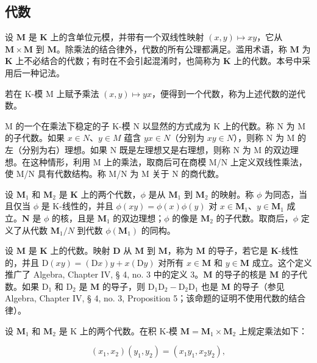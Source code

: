 \subsection{代数}

设 \(\mathbf{M}\) 是 \(\mathbf{K}\) 上的含单位元模，并带有一个双线性映射 \((x,y)\mapsto xy\)，它从 \(\mathbf{M}\times \mathbf{M}\) 到 \(\mathbf{M}\)。除乘法的结合律外，代数的所有公理都满足。滥用术语，称 \(\mathbf{M}\) 为 \(\mathbf{K}\) 上不必结合的代数；有时在不会引起混淆时，也简称为 \(\mathbf{K}\) 上的代数。本号中采用后一种记法。

若在 K-模 M 上赋予乘法 \((x,y)\mapsto yx\)，便得到一个代数，称为上述代数的逆代数。

M 的一个在乘法下稳定的子 K-模 N 以显然的方式成为 K 上的代数。称 N 为 M 的子代数。如果 \(x \in N\)、\(y \in M\) 蕴含 \(yx \in N\)（分别为 \(xy \in N\)），则称 N 为 M 的左（分别为右）理想。如果 N 既是左理想又是右理想，则称 N 为 M 的双边理想。在这种情形，利用 M 上的乘法，取商后可在商模 M/N 上定义双线性乘法，使 M/N 具有代数结构。称 M/N 为 M 关于 N 的商代数。

设 \(\mathbf{M}_1\) 和 \(\mathbf{M}_2\) 是 \(\mathbf{K}\) 上的两个代数，\(\phi\) 是从 \(\mathbf{M}_1\) 到 \(\mathbf{M}_2\) 的映射。称 \(\phi\) 为同态，当且仅当 \(\phi\) 是 K-线性的，并且 \(\phi(xy) = \phi(x)\phi(y)\) 对 \(x\in \mathbf{M}_1\)、\(y\in \mathbf{M}_1\) 成立。\(\mathbf{N}\) 是 \(\phi\) 的核，且是 \(\mathbf{M}_1\) 的双边理想；\(\phi\) 的像是 \(\mathbf{M}_2\) 的子代数。取商后，\(\phi\) 定义了从代数 \(\mathbf{M}_1 / N\) 到代数 \(\phi (\mathbf{M}_1)\) 的同构。

设 \(\mathbf{M}\) 是 \(\mathbf{K}\) 上的代数。映射 \(\mathbf{D}\) 从 \(\mathbf{M}\) 到 \(\mathbf{M}\)，称为 \(\mathbf{M}\) 的导子，若它是 \(\mathbf{K}\)-线性的，并且 \(\mathrm{D}(xy) = (\mathrm{D}x)y + x(\mathrm{D}y)\) 对所有 \(x \in \mathbf{M}\) 和 \(y \in \mathbf{M}\) 成立。这个定义推广了 Algebra, Chapter IV, § 4, no. 3 中的定义 3。\(\mathbf{M}\) 的导子的核是 \(\mathbf{M}\) 的子代数。如果 \(\mathrm{D}_1\) 和 \(\mathrm{D}_2\) 是 \(\mathbf{M}\) 的导子，则 \(\mathrm{D}_1\mathrm{D}_2 - \mathrm{D}_2\mathrm{D}_1\) 也是 \(\mathbf{M}\) 的导子（参见 Algebra, Chapter IV, § 4, no. 3, Proposition 5；该命题的证明不使用代数的结合律）。

设 \(\mathbf{M}_1\) 和 \(\mathbf{M}_2\) 是 K 上的两个代数。在积 K-模 \(\mathbf{M} = \mathbf{M}_1 \times \mathbf{M}_2\) 上规定乘法如下：

\[
(x _ {1}, x _ {2}) (y _ {1}, y _ {2}) = (x _ {1} y _ {1}, x _ {2} y _ {2}),
\]

